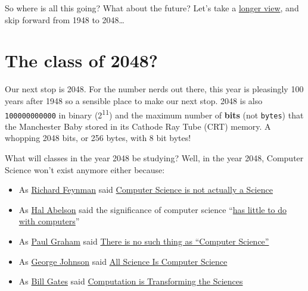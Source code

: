 \documentclass[
  12pt,
]{book}
\providecommand{\tightlist}{%
  \setlength{\itemsep}{0pt}\setlength{\parskip}{0pt}}
\begin{document}
So where is all this going? What about the future? Let's take a \href{https://en.wikipedia.org/wiki/Long_Now_Foundation}{longer view}, and skip forward from 1948 to 2048\ldots{}

\hypertarget{y2048}{%
\section{The class of 2048?}\label{y2048}}

Our next stop is 2048. For the number nerds out there, this year is pleasingly 100 years after 1948 so a sensible place to make our next stop. 2048 is also \texttt{100000000000} in binary (2\textsuperscript{11}) and the maximum number of \textbf{bits} (not \texttt{bytes}) that the Manchester Baby stored in its Cathode Ray Tube (CRT) memory. A whopping 2048 bits, or 256 bytes, with 8 bit bytes! \citep{kilburnphd}

What will classes in the year 2048 be studying? Well, in the year 2048, Computer Science won't exist anymore either because:

\begin{itemize}
\tightlist
\item
  As \href{https://en.wikipedia.org/wiki/Richard_Feynman}{Richard Feynman} said \href{https://www.flickr.com/photos/dullhunk/51956613478/}{Computer Science is not actually a Science} \citep{feynmanfysics}
\item
  As \href{https://en.wikipedia.org/wiki/Hal_Abelson}{Hal Abelson} said the significance of computer science ``\href{https://mitpress.mit.edu/sites/default/files/sicp/full-text/book/book-Z-H-7.html}{has little to do with computers}'' \citep{abelson}
\item
  As \href{https://en.wikipedia.org/wiki/Paul_Graham_(programmer)}{Paul Graham} said \href{http://www.paulgraham.com/hp.html}{There is no such thing as ``Computer Science''} \citep{bloggersandpainters, hackersandpainters}
\item
  As \href{https://en.wikipedia.org/wiki/George_Johnson_\%28writer\%29}{George Johnson} said \href{https://www.nytimes.com/2001/03/25/weekinreview/the-world-in-silica-fertilization-all-science-is-computer-science.html}{All Science Is Computer Science} \citep{georgejohnson}
\item
  As \href{https://en.wikipedia.org/wiki/Bill_Gates}{Bill Gates} said \href{https://web.archive.org/web/20080221053710/https://www.microsoft.com/presspass/exec/billg/speeches/2005/11-15SuperComputing05.aspx}{Computation is Transforming the Sciences} \citep{gatescompute}
\end{itemize}
\end{document}
